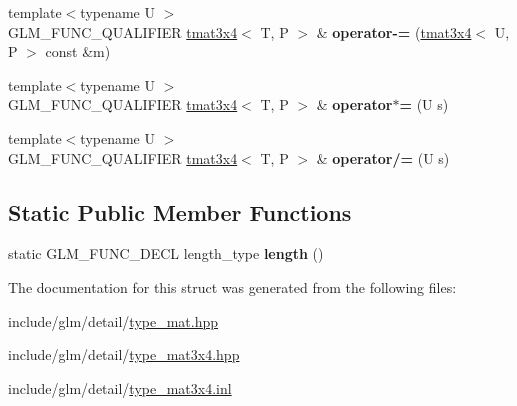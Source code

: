 \begin{DoxyCompactItemize}
{\footnotesize template$<$typename U $>$ }\\G\+L\+M\+\_\+\+F\+U\+N\+C\+\_\+\+Q\+U\+A\+L\+I\+F\+I\+ER \hyperlink{structglm_1_1tmat3x4}{tmat3x4}$<$ T, P $>$ \& {\bfseries operator-\/=} (\hyperlink{structglm_1_1tmat3x4}{tmat3x4}$<$ U, P $>$ const \&m)
\item 
\mbox{\label{structglm_1_1tmat3x4_ada114a6d8a4f1b662be96a3e5e0bc910}} 
{\footnotesize template$<$typename U $>$ }\\G\+L\+M\+\_\+\+F\+U\+N\+C\+\_\+\+Q\+U\+A\+L\+I\+F\+I\+ER \hyperlink{structglm_1_1tmat3x4}{tmat3x4}$<$ T, P $>$ \& {\bfseries operator$\ast$=} (U s)
\item 
\mbox{\label{structglm_1_1tmat3x4_a2cf29af3f032cdab63648fb0d4776274}} 
{\footnotesize template$<$typename U $>$ }\\G\+L\+M\+\_\+\+F\+U\+N\+C\+\_\+\+Q\+U\+A\+L\+I\+F\+I\+ER \hyperlink{structglm_1_1tmat3x4}{tmat3x4}$<$ T, P $>$ \& {\bfseries operator/=} (U s)
\end{DoxyCompactItemize}
\subsection*{Static Public Member Functions}
\begin{DoxyCompactItemize}
\item 
\mbox{\label{structglm_1_1tmat3x4_a670b84ce9f1e862e83d3ba30648f464b}} 
static G\+L\+M\+\_\+\+F\+U\+N\+C\+\_\+\+D\+E\+CL length\+\_\+type {\bfseries length} ()
\end{DoxyCompactItemize}


The documentation for this struct was generated from the following files\+:\begin{DoxyCompactItemize}
\item 
include/glm/detail/\hyperlink{type__mat_8hpp}{type\+\_\+mat.\+hpp}\item 
include/glm/detail/\hyperlink{type__mat3x4_8hpp}{type\+\_\+mat3x4.\+hpp}\item 
include/glm/detail/\hyperlink{type__mat3x4_8inl}{type\+\_\+mat3x4.\+inl}\end{DoxyCompactItemize}

